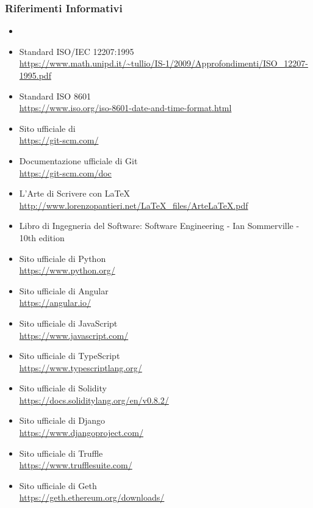 \subsubsection{Riferimenti Informativi}
\begin{itemize}
\item {}
\item{Standard ISO/IEC 12207:1995 \\
\url{https://www.math.unipd.it/~tullio/IS-1/2009/Approfondimenti/ISO_12207-1995.pdf}}
\item{Standard ISO 8601 \\
	\url{https://www.iso.org/iso-8601-date-and-time-format.html}}
\item{Sito ufficiale di  \\
\url{https://git-scm.com/}}
\item{Documentazione ufficiale di Git} \\
\url{https://git-scm.com/doc}
\item{L’Arte di Scrivere con \LaTeX \\
\url{http://www.lorenzopantieri.net/LaTeX_files/ArteLaTeX.pdf}}
\item{Libro di Ingegneria del Software: Software Engineering - Ian Sommerville - 10th edition}
\item{Sito ufficiale di Python} \\
\url{https://www.python.org/}
\item{Sito ufficiale di Angular} \\
\url{https://angular.io/}
\item{Sito ufficiale di JavaScript} \\
\url{https://www.javascript.com/}
\item{Sito ufficiale di TypeScript} \\
\url{https://www.typescriptlang.org/}
\item{Sito ufficiale di Solidity} \\
\url{https://docs.soliditylang.org/en/v0.8.2/}
\item{Sito ufficiale di Django} \\
\url{https://www.djangoproject.com/}
\item{Sito ufficiale di Truffle} \\
\url{https://www.trufflesuite.com/}
\item{Sito ufficiale di Geth} \\
\url{https://geth.ethereum.org/downloads/}
\end{itemize}
